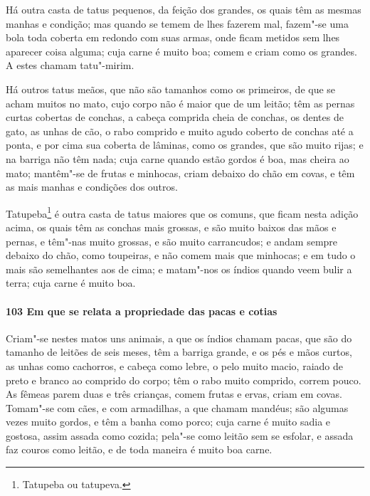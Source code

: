 \begin{linenumbers}
Há outra casta de tatus pequenos, da feição dos grandes, os quais têm as mesmas manhas e
condição; mas quando se temem de lhes fazerem mal, fazem"-se uma bola toda coberta em
redondo com suas armas, onde ficam metidos sem lhes aparecer coisa alguma; cuja carne é
muito boa; comem e criam como os grandes. A estes chamam tatu"-mirim.

Há outros tatus meãos, que não são tamanhos como os primeiros, de que se acham muitos no
mato, cujo corpo não é maior que de um leitão; têm as pernas curtas cobertas de conchas, a
cabeça comprida cheia de conchas, os dentes de gato, as unhas de cão, o rabo comprido e
muito agudo coberto de conchas até a ponta, e por cima sua coberta de lâminas, como os
grandes, que são muito rijas; e na barriga não têm nada; cuja carne quando estão gordos é
boa, mas cheira ao mato; mantêm"-se de frutas e minhocas, criam debaixo do chão em covas, e
têm as mais manhas e condições dos outros.

Tatupeba\footnote{ Tatupeba ou tatupeva.} é outra casta de tatus maiores que os comuns,
que ficam nesta adição acima, os quais têm as conchas mais grossas, e são muito baixos das
mãos e pernas, e têm"-nas muito grossas, e são muito carrancudos; e andam sempre debaixo do
chão, como toupeiras, e não comem mais que minhocas; e em tudo o mais são semelhantes aos
de cima; e matam"-nos os índios quando veem bulir a terra; cuja carne é muito boa.

\paragraph{103 Em que se relata a propriedade das pacas e cotias}\quad
Criam"-se nestes matos uns animais, a que os índios chamam pacas, que são do tamanho de
leitões de seis meses, têm a barriga grande, e os pés e mãos curtos, as unhas como
cachorros, e cabeça como lebre, o pelo muito macio, raiado de preto e branco ao comprido
do corpo; têm o rabo muito comprido, correm pouco. As fêmeas parem duas e três crianças,
comem frutas e ervas, criam em covas. Tomam"-se com cães, e com armadilhas, a que chamam
mandéus; são algumas vezes muito gordos, e têm a banha como porco; cuja carne é muito
sadia e gostosa, assim assada como cozida; pela"-se como leitão sem se esfolar, e assada
faz couros como leitão, e de toda maneira é muito boa carne.


\end{linenumbers}
